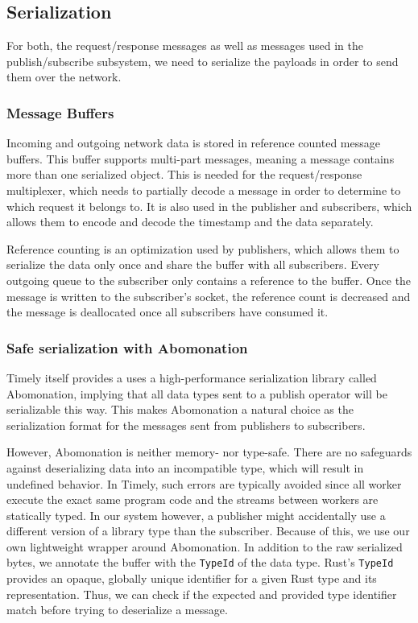 \subsection{Serialization} \label{sec:serialization}

For both, the request/response messages as well as messages used in the publish/subscribe
subsystem, we need to serialize the payloads in order to send them over the network.

\subsubsection{Message Buffers}

Incoming and outgoing network data is stored in reference counted message buffers.
This buffer supports multi-part messages, meaning a message contains more than
one serialized object. This is needed for the request/response multiplexer, which
needs to partially decode a message in order to determine to which request it
belongs to. It is also used in the publisher and subscribers, which allows them
to encode and decode the timestamp and the data separately.

Reference counting is an optimization used by publishers, which allows them to
serialize the data only once and share the buffer with all subscribers. Every
outgoing queue to the subscriber only contains a reference to the buffer. Once
the message is written to the subscriber's socket, the reference count is
decreased and the message is deallocated once all subscribers have consumed it.

\subsubsection{Safe serialization with Abomonation}

Timely itself provides a uses a high-performance serialization library called
Abomonation, implying that all data types sent to a publish operator will be
serializable this way. This makes Abomonation a natural choice as the serialization
format for the messages sent from publishers to subscribers. 

However, Abomonation is neither memory- nor type-safe. There are no safeguards
against deserializing data into an incompatible type, which will result in undefined
behavior. In Timely, such errors are typically avoided since all worker
execute the exact same program code and the streams between workers are
statically typed. In our system however, a publisher might accidentally use
a different version of a library type than the subscriber. Because of this,
we use our own lightweight wrapper around Abomonation. In addition to the raw
serialized bytes, we annotate the buffer with the \lstinline{TypeId} of the
data type. Rust's \lstinline{TypeId} provides an opaque, globally unique
identifier for a given Rust type and its representation. Thus, we can check
if the expected and provided type identifier match before trying to deserialize
a message.

